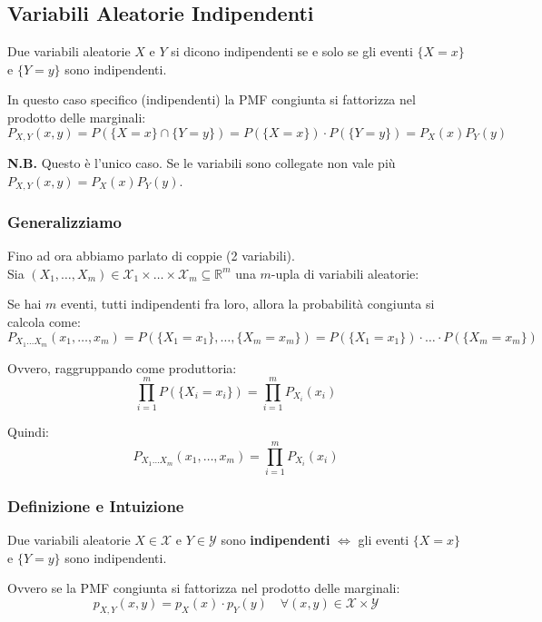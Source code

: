 \subsection{Variabili Aleatorie Indipendenti}

Due variabili aleatorie $X$ e $Y$ si dicono indipendenti se e solo se gli eventi $\{X=x\}$ e $\{Y=y\}$ sono indipendenti.

In questo caso specifico (indipendenti) la PMF congiunta si fattorizza nel prodotto delle marginali:
\begin{equation}
P_{X,Y}(x,y) = P(\{X=x\} \cap \{Y=y\}) = P(\{X=x\}) \cdot P(\{Y=y\}) = P_X(x) P_Y(y)
\end{equation}

\textbf{N.B.} Questo è l'unico caso. Se le variabili sono collegate non vale più $P_{X,Y}(x,y) = P_X(x) P_Y(y)$.

\subsubsection{Generalizziamo}

Fino ad ora abbiamo parlato di coppie (2 variabili).
\\Sia $(X_1, \dots, X_m) \in \mathcal{X}_1 \times \dots \times \mathcal{X}_m \subseteq \mathbb{R}^m$ una $m$-upla di variabili aleatorie:

Se hai $m$ eventi, tutti indipendenti fra loro, allora la probabilità congiunta si calcola come:
\begin{equation}
P_{X_1 \dots X_m}(x_1, \dots, x_m) = P(\{X_1=x_1\}, \dots, \{X_m=x_m\}) = P(\{X_1=x_1\}) \cdot  \dots  \cdot P(\{X_m=x_m\})
\end{equation}

Ovvero, raggruppando come produttoria:
\[
\prod_{i=1}^m P(\{X_i=x_i\}) = \prod_{i=1}^m P_{X_i}(x_i)
\]

Quindi:
\begin{equation}
\boxed{P_{X_1 \dots X_m}(x_1, \dots, x_m) = \prod_{i=1}^m P_{X_i}(x_i)}
\end{equation}

\subsubsection{Definizione e Intuizione}

Due variabili aleatorie $X \in \mathcal{X}$ e $Y \in \mathcal{Y}$ sono \textbf{indipendenti} $\iff$ gli eventi $\{X=x\}$ e $\{Y=y\}$ sono indipendenti.

Ovvero se la PMF congiunta si fattorizza nel prodotto delle marginali:
\begin{equation}
p_{X,Y}(x,y) = p_X(x) \cdot p_Y(y) \quad \forall (x,y) \in \mathcal{X} \times \mathcal{Y}
\end{equation}

